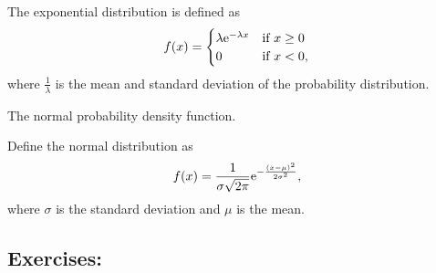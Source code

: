 The exponential distribution is defined as 
\begin{equation}
    \label{eq:exponential_dist}
    f(x) = 
    \begin{cases}
        \lambda{\rm e}^{-\lambda x} & \text{if } x \geq 0 \\
        0 & \text{if } x<0,
    \end{cases}
\end{equation}
where $\frac{1}{\lambda}$ is the mean and standard deviation of the probability distribution.

\begin{marginfigure}
    \hspace{-4cm}
    \centering
    \caption{The normal probability density function.}
    \label{fig:normal_dist}
\end{marginfigure}

Define the normal distribution as 
\begin{equation}
    \label{eq:normal_dist}
    f(x) = \frac{1}{\sigma \sqrt{2\pi}}{\rm e}^{-\frac{(x-\mu)^2}{2\sigma^2}},
\end{equation} 
where $\sigma$ is the standard deviation and $\mu$ is the mean.

\subsection*{Exercises:}

